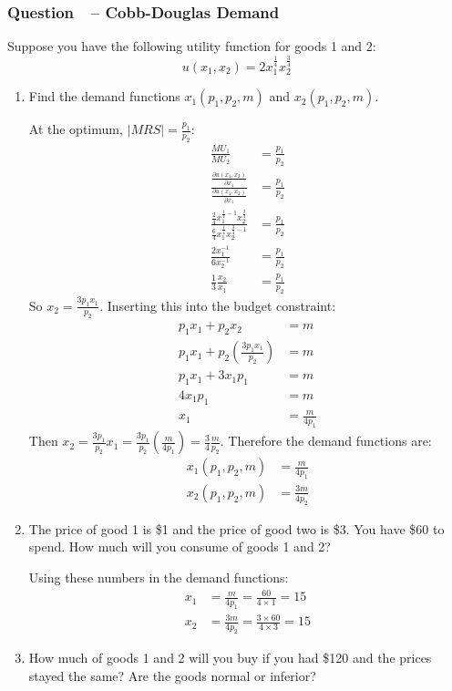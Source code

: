 \documentclass[12pt]{article}
\newcounter{question}[section]
\newcommand{\question}[1]{\refstepcounter{question}
  \subsubsection*{Question~\thequestion~-- #1}}
\newenvironment{subquestions}{
  \begin{enumerate}[label=(\roman*)]}{\end{enumerate}}
\begin{document}
\question{Cobb-Douglas Demand}
Suppose you have the following utility function for goods 1 and 2:
\[
  u\left( x_1,x_2 \right) = 2 x_1^{\frac{1}{4}}x_2^{\frac{3}{4}}
\]
\begin{subquestions}
  \item Find the demand functions $x_1\left( p_1,p_2,m \right)$ and $x_2\left(
    p_1,p_2,m \right)$.

    \textcolor{solution-color}{
      At the optimum, $\left| MRS \right|=\frac{p_1}{p_2}$:
      \begin{align*}
        \frac{MU_1}{MU_2} &= \frac{p_1}{p_2} \\
        \frac{\frac{\partial u\left(x_1,x_2 \right)}{\partial x_1}}
             {\frac{\partial u\left(x_1,x_2 \right)}{\partial x_1}} &=
             \frac{p_1}{p_2} \\
             \frac{\frac{2}{4}x_1^{\frac{1}{4}-1}x_2^{\frac{3}{4}}}
             {\frac{6}{4}x_1^{\frac{1}{4}}x_2^{\frac{3}{4}-1}}
             &= \frac{p_1}{p_2} \\
             \frac{2 x_1^{-1}}
             {6x_2^{-1}}
             &= \frac{p_1}{p_2} \\
             \frac{1}{3}\frac{x_2}{x_1} &=\frac{p_1}{p_2}
      \end{align*}
      So $x_2 = \frac{3p_1x_1}{p_2}$. Inserting this into the budget
      constraint:
      \begin{align*}
        p_1x_1 + p_2x_2 &= m \\
        p_1x_1 + p_2 \left( \frac{3p_1x_1}{p_2} \right) &= m \\
        p_1x_1 + 3x_1p_1 &= m \\
        4x_1p_1 &= m \\
        x_1 &= \frac{m}{4p_1}
      \end{align*}
      Then $x_2 = \frac{3p_1}{p_2}x_1 = \frac{3p_1}{p_2}\left(
      \frac{m}{4p_1} \right)= \frac{3}{4}\frac{m}{p_2}$.
      Therefore the demand functions are:
      \begin{align*}
        x_1\left( p_1,p_2,m \right) &= \frac{m}{4p_1} \\
        x_2\left( p_1,p_2,m \right) &= \frac{3m}{4p_2}
      \end{align*}
    }
  \item The price of good 1 is \$1 and the price of good two is \$3. You have
    \$60 to spend. How much will you consume of goods 1 and 2?

    \textcolor{solution-color}{
      Using these numbers in the demand functions:
      \begin{align*}
        x_1&= \frac{m}{4p_1} = \frac{60}{4\times 1}=15\\
        x_2&= \frac{3m}{4p_2} = \frac{3\times 60}{4\times 3} = 15
      \end{align*}
    }
  \item How much of goods 1 and 2 will you buy if you had \$120 and the prices
    stayed the same? Are the goods normal or inferior?


\end{subquestions}
\end{document}
